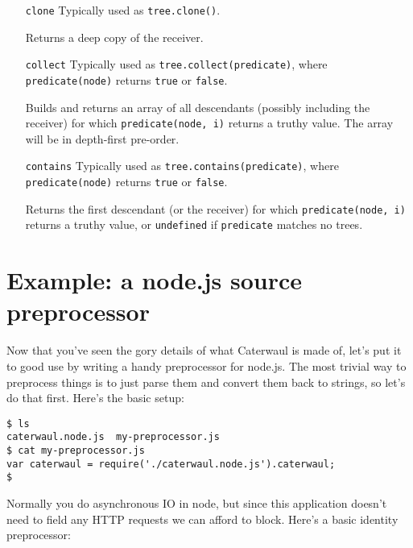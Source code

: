 \documentclass{report}
\begin{document}
\begin{enumerate}
\item[{\tt clone}]
  Typically used as {\tt tree.clone()}.

  Returns a deep copy of the receiver.

\item[{\tt collect}]
  Typically used as {\tt tree.collect(predicate)}, where {\tt predicate(node)} returns {\tt true} or {\tt false}.

  Builds and returns an array of all descendants (possibly including the receiver) for which {\tt predicate(node, i)} returns a truthy value. The array will be in depth-first pre-order.

\item[{\tt contains}]
  Typically used as {\tt tree.contains(predicate)}, where {\tt predicate(node)} returns {\tt true} or {\tt false}.

  Returns the first descendant (or the receiver) for which {\tt predicate(node, i)} returns a truthy value, or {\tt undefined} if {\tt predicate} matches no trees.
\end{enumerate}

\chapter{Example: a node.js source preprocessor}
  Now that you've seen the gory details of what Caterwaul is made of, let's put it to good use by writing a handy preprocessor for node.js. The most trivial way to preprocess things is to just
  parse them and convert them back to strings, so let's do that first. Here's the basic setup:

\begin{verbatim}
$ ls
caterwaul.node.js  my-preprocessor.js
$ cat my-preprocessor.js
var caterwaul = require('./caterwaul.node.js').caterwaul;
$
\end{verbatim}

  Normally you do asynchronous IO in node, but since this application doesn't need to field any HTTP requests we can afford to block. Here's a basic identity preprocessor:

\end{document}
